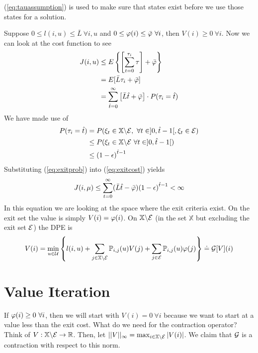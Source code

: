 (\ref{eq:tauassumption}) is used to make sure that states exist before we use those states for a solution.

Suppose $0\leq l(i,u)\leq \bar{L}~\forall i,u$ and $0\leq \varphi(i) \leq \bar{\varphi}~\forall i$, then $V(i)\geq0~\forall i$.
Now we can look at the cost function to see
\begin{align}
\label{eq:exitcost}
J(i,u) &\leq E\left\lbrace \left[\sum_{t=0}^{\tau_i}\tau\right] + \bar{\varphi}\right\rbrace \nonumber \\
&= E[\bar{L}\tau_i+\bar{\varphi}] \nonumber \\
&= \sum_{\hat{t}=0}^\infty\left[\bar{L}\hat{t}+\bar{\varphi}\right]\cdot P(\tau_i=\hat{t})
\end{align}
We have made use of
\begin{align}
\label{eq:exitprob}
P(\tau_i=\hat{t}) &= P(\xi_t\in\mathbb{X}\backslash\cale,~\forall t\in]0,\hat{t}-1[, \xi_t\in\cale) \nonumber \\%
&\leq P(\xi_t\in\mathbb{X}\backslash\cale~\forall t\in]0,\hat{t}-1[) \nonumber \\%
&\leq {(1-\epsilon)}^{\hat{t}-1}
\end{align}
Substituting (\ref{eq:exitprob}) into (\ref{eq:exitcost}) yields
$$J(i,\mu) \leq \sum_{t=0}^\infty (\bar{L}\hat{t}-\bar{\varphi}){(1-\epsilon)}^{\hat{t}-1}<\infty$$
In this equation we are looking at the space where the exit criteria exist.
On the exit set the value is simply $V(i)=\varphi(i)$.
On $\mathbb{X}\backslash\mathcal{E}$ (in the set $\mathbb{X}$ but excluding the exit set $\mathcal{E}$) the DPE is
$$V(i) = \min_{u\in\mathcal{U}}\left\lbrace l(i,u) + \sum_{j\in\mathbb{X}\backslash\mathcal{E}}\mathbb{P}_{i,j}(u)V(j) + \sum_{j\in\mathcal{E}}\mathbb{P}_{i,j}(u)\varphi(j)\right\rbrace \doteq \mathcal{G}[V](i)$$

\section{Value Iteration}
If $\varphi(i)\geq0~\forall i$, then we will start with $V(i)=0~\forall i$ because we want to start at a value less than the exit cost.
What do we need for the contraction operator? Think of $V:\mathbb{X}\backslash\mathcal{E}\to\mathbb{R}$.
Then, let $||V||_\infty = \max_{i\in\mathbb{X}\backslash\mathcal{E}}|V(i)|$.
We claim that $\mathcal{G}$ is a contraction with respect to this norm.

